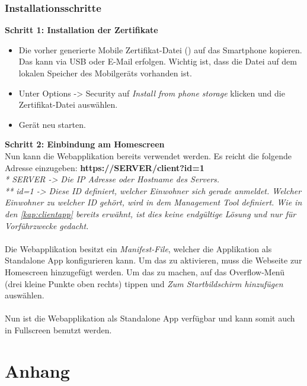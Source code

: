 \subsubsection{Installationsschritte}
\label{kap:clientappinst}
\textbf{Schritt 1: Installation der Zertifikate}
\begin{itemize}
	\item Die vorher generierte Mobile Zertifikat-Datei () auf das Smartphone kopieren. Das kann via USB oder E-Mail erfolgen. Wichtig ist, dass die Datei auf dem lokalen Speicher des Mobilgeräts vorhanden ist.
	\item Unter Options -> Security auf \textit{Install from  phone storage} klicken und die Zertifikat-Datei auswählen.
	\item Gerät neu starten.
\end{itemize}

\textbf{Schritt 2: Einbindung am Homescreen}
\\
Nun kann die Webapplikation bereits verwendet werden. Es reicht die folgende Adresse einzugeben: \textbf{https://SERVER/client?id=1}
\\
\textit{* SERVER -> Die IP Adresse oder Hostname des Servers.}
\\
\textit{** id=1 -> Diese ID definiert, welcher Einwohner sich gerade anmeldet. Welcher Einwohner zu welcher ID gehört, wird in dem Management Tool definiert. Wie in den \cref{kap:clientapp} bereits erwähnt, ist dies keine endgültige Lösung und nur für Vorführzwecke gedacht.}
\\
\\
Die Webapplikation besitzt ein \textit{Manifest-File}, welcher die Applikation als Standalone App konfigurieren kann. Um das zu aktivieren, muss die Webseite zur Homescreen hinzugefügt werden. Um das zu machen, auf das Overflow-Menü (drei kleine Punkte oben rechts) tippen und \textit{Zum Startbildschirm hinzufügen} auswählen.
\\
\\
Nun ist die Webapplikation als Standalone App verfügbar und kann somit auch in Fullscreen benutzt werden.


\section{Anhang}
\label{sec:anhang}

